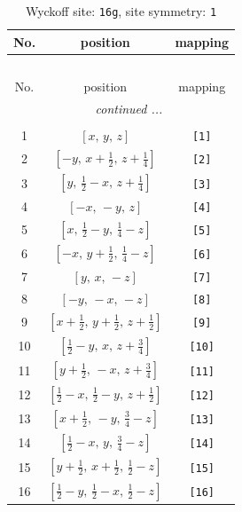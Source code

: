 \documentclass[fleqn,8pt]{jsarticle}
\begin{document}
\begin{longtable}{ccc}
\caption{Wyckoff site: {\tt 16g}, site symmetry: {\tt 1}}
 \\
 \hline \hline
No. & position & mapping \\ \hline \endfirsthead

\multicolumn{2}{l}{\tablename\ \thetable{}} \\
 \hline \hline
No. & position & mapping \\ \hline \endhead

 \hline \hline
\multicolumn{2}{r}{\footnotesize\it continued ...} \\ \endfoot

 \hline \hline
\multicolumn{2}{r}{} \\ \endlastfoot

1 & $\left[ x,\, y,\, z \right]$ & {\tt [1]} \\ \hline
2 & $\left[ - y,\, x + \frac{1}{2},\, z + \frac{1}{4} \right]$ & {\tt [2]} \\ \hline
3 & $\left[ y,\, \frac{1}{2} - x,\, z + \frac{1}{4} \right]$ & {\tt [3]} \\ \hline
4 & $\left[ - x,\, - y,\, z \right]$ & {\tt [4]} \\ \hline
5 & $\left[ x,\, \frac{1}{2} - y,\, \frac{1}{4} - z \right]$ & {\tt [5]} \\ \hline
6 & $\left[ - x,\, y + \frac{1}{2},\, \frac{1}{4} - z \right]$ & {\tt [6]} \\ \hline
7 & $\left[ y,\, x,\, - z \right]$ & {\tt [7]} \\ \hline
8 & $\left[ - y,\, - x,\, - z \right]$ & {\tt [8]} \\ \hline
9 & $\left[ x + \frac{1}{2},\, y + \frac{1}{2},\, z + \frac{1}{2} \right]$ & {\tt [9]} \\ \hline
10 & $\left[ \frac{1}{2} - y,\, x,\, z + \frac{3}{4} \right]$ & {\tt [10]} \\ \hline
11 & $\left[ y + \frac{1}{2},\, - x,\, z + \frac{3}{4} \right]$ & {\tt [11]} \\ \hline
12 & $\left[ \frac{1}{2} - x,\, \frac{1}{2} - y,\, z + \frac{1}{2} \right]$ & {\tt [12]} \\ \hline
13 & $\left[ x + \frac{1}{2},\, - y,\, \frac{3}{4} - z \right]$ & {\tt [13]} \\ \hline
14 & $\left[ \frac{1}{2} - x,\, y,\, \frac{3}{4} - z \right]$ & {\tt [14]} \\ \hline
15 & $\left[ y + \frac{1}{2},\, x + \frac{1}{2},\, \frac{1}{2} - z \right]$ & {\tt [15]} \\ \hline
16 & $\left[ \frac{1}{2} - y,\, \frac{1}{2} - x,\, \frac{1}{2} - z \right]$ & {\tt [16]} \\
\end{longtable}
\end{document}
